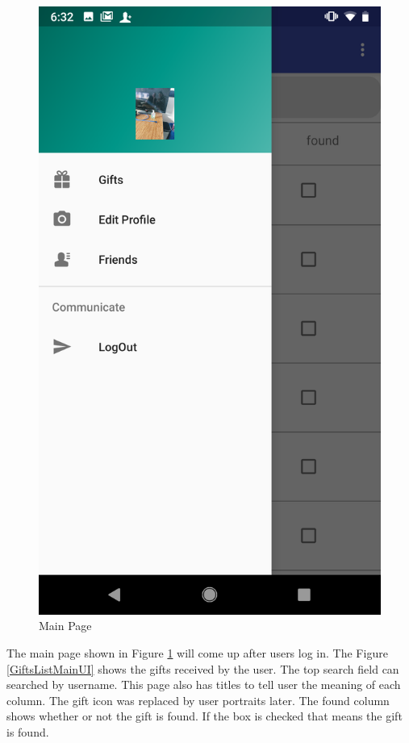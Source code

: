 \begin{figure}[htb]
\begin{minipage}[t]{0.27\textwidth}
\includegraphics[width=.95\textwidth]{section03/assets/MainPortrait.png}
\subcaption{\label{FunctionsMainUI}}
\end{minipage}%
\caption[Short Caption 2]{\label{MainPageUI}Main Page}
\end{figure}
\par The main page shown in Figure \ref{MainPageUI} will come up after users log in. The Figure \ref{GiftsListMainUI} shows the gifts received by the user. The top search field can searched by username. This page also has titles to tell user the meaning of each column. The gift icon was replaced by user portraits later. The found column shows whether or not the gift is found. If the box is checked that means the gift is found.

